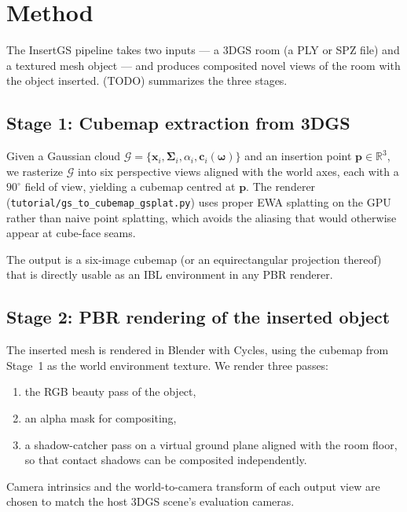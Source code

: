
\chapter{Method}\label{chapter:method}

The InsertGS pipeline takes two inputs --- a 3DGS room (a \ac{PLY} or
\ac{SPZ} file) and a textured mesh object --- and produces composited novel
views of the room with the object inserted.  (TODO)
summarizes the three stages.

\section{Stage 1: Cubemap extraction from 3DGS}

Given a Gaussian cloud $\mathcal{G} = \{\mathbf{x}_i, \boldsymbol{\Sigma}_i,
\alpha_i, \mathbf{c}_i(\boldsymbol{\omega})\}$ and an insertion point
$\mathbf{p}\in\mathbb{R}^3$, we rasterize $\mathcal{G}$ into six perspective
views aligned with the world axes, each with a $90^\circ$ field of view,
yielding a cubemap centred at $\mathbf{p}$. The renderer
(\texttt{tutorial/gs\_to\_cubemap\_gsplat.py}) uses proper \ac{EWA}
splatting on the GPU rather than naive point splatting, which avoids the
aliasing that would otherwise appear at cube-face seams.

The output is a six-image cubemap (or an equirectangular projection thereof)
that is directly usable as an \ac{IBL} environment in any PBR renderer.

\section{Stage 2: PBR rendering of the inserted object}

The inserted mesh is rendered in Blender with Cycles, using the cubemap
from Stage~1 as the world environment texture. We render three passes:

\begin{enumerate}
  \item the RGB beauty pass of the object,
  \item an alpha mask for compositing,
  \item a shadow-catcher pass on a virtual ground plane aligned with the
        room floor, so that contact shadows can be composited
        independently.
\end{enumerate}

Camera intrinsics and the world-to-camera transform of each output view are
chosen to match the host 3DGS scene's evaluation cameras.

